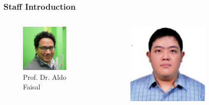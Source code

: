 \documentclass{beamer}
\begin{document}
    \begin{frame}
        \frametitle{Staff Introduction}
        \begin{columns}[c]
            \begin{column}{.33\textwidth}
                \begin{figure}
                    \centering
                    \includegraphics[width=0.75\textwidth]{figures/aldo.jpg}
                    \caption{Prof. Dr. Aldo Faisal}
                    \label{fig:aldo}
                \end{figure}      
            \end{column}
            \begin{column}{.33\textwidth}
                \begin{figure}
                    \centering
                    \includegraphics[width=0.75\textwidth]{figures/chai.jpeg}

\end{figure}
\end{column}
\end{columns}
\end{frame}
\end{document}
